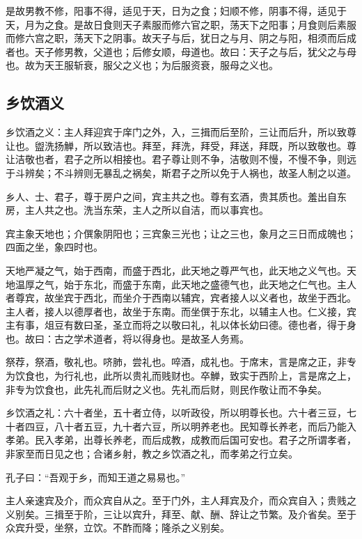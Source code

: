 \documentclass[]{article}
\begin{document}
是故男教不修，阳事不得，适见于天，日为之食；妇顺不修，阴事不得，适见于天，月为之食。是故日食则天子素服而修六官之职，荡天下之阳事；月食则后素服而修六宫之职，荡天下之阴事。故天子与后，犹日之与月、阴之与阳，相须而后成者也。天子修男教，父道也；后修女顺，母道也。故曰：天子之与后，犹父之与母也。故为天王服斩衰，服父之义也；为后服资衰，服母之义也。

\hypertarget{header-n915}{%
\subsection{乡饮酒义}\label{header-n915}}

乡饮酒之义：主人拜迎宾于庠门之外，入，三揖而后至阶，三让而后升，所以致尊让也。盥洗扬觯，所以致洁也。拜至，拜洗，拜受，拜送，拜既，所以致敬也。尊让洁敬也者，君子之所以相接也。君子尊让则不争，洁敬则不慢，不慢不争，则远于斗辨矣；不斗辨则无暴乱之祸矣，斯君子之所以免于人祸也，故圣人制之以道。

乡人、士、君子，尊于房户之间，宾主共之也。尊有玄酒，贵其质也。羞出自东房，主人共之也。洗当东荣，主人之所以自洁，而以事宾也。

宾主象天地也；介僎象阴阳也；三宾象三光也；让之三也，象月之三日而成魄也；四面之坐，象四时也。

天地严凝之气，始于西南，而盛于西北，此天地之尊严气也，此天地之义气也。天地温厚之气，始于东北，而盛于东南，此天地之盛德气也，此天地之仁气也。主人者尊宾，故坐宾于西北，而坐介于西南以辅宾，宾者接人以义者也，故坐于西北。主人者，接人以德厚者也，故坐于东南。而坐僎于东北，以辅主人也。仁义接，宾主有事，俎豆有数曰圣，圣立而将之以敬曰礼，礼以体长幼曰德。德也者，得于身也。故曰：古之学术道者，将以得身也。是故圣人务焉。

祭荐，祭酒，敬礼也。哜肺，尝礼也。啐酒，成礼也。于席末，言是席之正，非专为饮食也，为行礼也，此所以贵礼而贱财也。卒觯，致实于西阶上，言是席之上，非专为饮食也，此先礼而后财之义也。先礼而后财，则民作敬让而不争矣。

乡饮酒之礼：六十者坐，五十者立侍，以听政役，所以明尊长也。六十者三豆，七十者四豆，八十者五豆，九十者六豆，所以明养老也。民知尊长养老，而后乃能入孝弟。民入孝弟，出尊长养老，而后成教，成教而后国可安也。君子之所谓孝者，非家至而日见之也；合诸乡射，教之乡饮酒之礼，而孝弟之行立矣。

孔子曰：``吾观于乡，而知王道之易易也。''

主人亲速宾及介，而众宾自从之。至于门外，主人拜宾及介，而众宾自入；贵贱之义别矣。三揖至于阶，三让以宾升，拜至、献、酬、辞让之节繁。及介省矣。至于众宾升受，坐祭，立饮。不酢而降；隆杀之义别矣。
\end{document}
